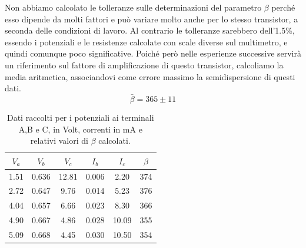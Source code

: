 \documentclass[italian,a4paper]{article}
\begin{document}
Non abbiamo calcolato le tolleranze sulle determinazioni del parametro
$\beta$ perch\'e esso dipende da molti fattori e può variare
molto anche per lo stesso transistor, a seconda delle condizioni di
lavoro. Al contrario le tolleranze sarebbero dell'1.5\%, essendo i
potenziali e le resistenze calcolate con scale diverse sul multimetro, e
quindi comunque poco significative. Poich\'e però nelle esperienze successive servirà un riferimento
sul fattore di amplificazione di questo transistor, calcoliamo la media
aritmetica, associandovi come errore massimo la semidispersione di questi dati.
\begin{equation*}
    \bar\beta = 365\pm11
\end{equation*}
\begin{table}[h]\caption{Dati raccolti per i potenziali ai terminali A,B e
    C, in Volt, correnti in \unit[]{mA} e relativi valori di $\beta$ calcolati.}
    \centering
    \begin{tabular}{*6c}
$V_a$ & $V_b$ & $V_c$ & $I_b$ & $I_c$ & $\beta$ \\\hline
1.51 & 0.636 & 12.81 & 0.006 & 2.20 & 374\\
2.72 & 0.647 & 9.76 & 0.014 & 5.23 & 376\\
4.04 & 0.657 & 6.66 & 0.023 & 8.30 & 366\\
4.90 & 0.667 & 4.86 & 0.028 & 10.09 & 355\\
5.09 & 0.668 & 4.45 & 0.030 & 10.50 & 354\\
\end{tabular}
    \end{table}\\
    
\end{document}
